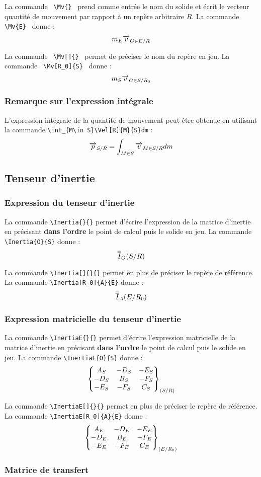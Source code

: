\documentclass[12pt]{article}
\begin{document}
La commande \verb| \Mv{} | prend comme entrée le nom du solide et écrit le vecteur quantité de mouvement par rapport à un repère arbitraire $R$. La commande  \verb| \Mv{E} | donne : $$\Mv{E}$$

La commande \verb| \Mv[]{} | permet de préciser le nom du repère en jeu. La commande  \verb| \Mv[R_0]{S} | donne : $$\Mv[R_0]{S}$$

\subsubsection{Remarque sur l'expression intégrale}

L'expression intégrale de la quantité de mouvement peut être obtenue en utilisant la commande \verb|\int_{M\in S}\Vel[R]{M}{S}dm| : $$\Psr{S}=\int_{M\in S}\Vel{M}{S}dm$$

\subsection{Tenseur d'inertie}

\subsubsection{Expression du tenseur d'inertie}

La commande \verb|\Inertia{}{}| permet d'écrire l'expression de la matrice d'inertie en précisant \textbf{dans l'ordre} le point de calcul puis le solide en jeu. La commande \verb|\Inertia{O}{S}| donne : $$\Inertia{O}{S}$$

La commande \verb|\Inertia[]{}{}| permet en plus de préciser le repère de référence. La commande \verb|\Inertia[R_0]{A}{E}| donne : $$\Inertia[R_0]{A}{E}$$

\subsubsection{Expression matricielle du tenseur d'inertie}

La commande \verb|\InertiaE{}{}| permet d'écrire l'expression matricielle de la matrice d'inertie en précisant \textbf{dans l'ordre} le point de calcul puis le solide en jeu. La commande \verb|\InertiaE{O}{S}| donne : $$\InertiaE{O}{S}$$

La commande \verb|\InertiaE[]{}{}| permet en plus de préciser le repère de référence. La commande \verb|\InertiaE[R_0]{A}{E}| donne : $$\InertiaE[R_0]{A}{E}$$

\subsubsection{Matrice de transfert}
\end{document}

